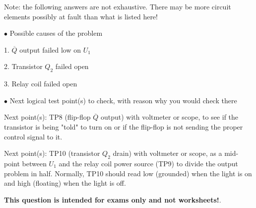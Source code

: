 Note: the following answers are not exhaustive.  There may be more circuit elements possibly at fault than what is listed here!

\medskip
\goodbreak
\item{$\bullet$} Possible causes of the problem
\item{1.} $\overline{Q}$ output failed low on $U_1$
\item{2.} Transistor $Q_2$ failed open
\item{3.} Relay coil failed open
\medskip

\medskip
\goodbreak
\item{$\bullet$} Next logical test point(s) to check, with reason why you would check there
\item{Next point(s):} TP8 (flip-flop $\overline{Q}$ output) with voltmeter or scope, to see if the transistor is being "told" to turn on or if the flip-flop is not sending the proper control signal to it.
\item{Next point(s):} TP10 (transistor $Q_2$ drain) with voltmeter or scope, as a mid-point between $U_1$ and the relay coil power source (TP9) to divide the output problem in half.  Normally, TP10 should read low (grounded) when the light is on and high (floating) when the light is off.
\medskip







{\bf This question is intended for exams only and not worksheets!}.




